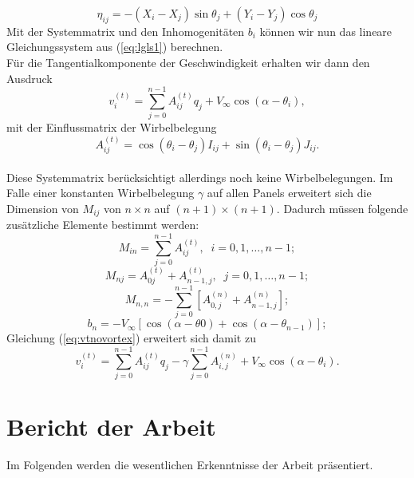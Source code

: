 \begin{equation}
\label{eq:eta}
\eta_{ij} =  -(X_i - X_j) \sin \theta _j + (Y_i - Y_j) \cos \theta _j
\end{equation}
Mit der Systemmatrix und den Inhomogenitäten $b_i$ können wir nun das lineare Gleichungssystem aus (\ref{eq:lgls1}) berechnen. \\
Für die Tangentialkomponente der Geschwindigkeit erhalten wir dann den Ausdruck
\begin{equation}
\label{eq:vtnovortex}
v_i^{(t)} =  \sum_{j=0}^{n-1} A_{ij}^{(t)} q_j + V_{\infty} \cos{(\alpha - \theta_i)},
\end{equation}
mit der Einflussmatrix der Wirbelbelegung
\begin{equation}
\label{eq:At}
A_{ij}^{(t)} =  \cos{(\theta _i - \theta _j)} I_{ij} + \sin{(\theta _i - \theta _j)} J_{ij}.
\end{equation}
\\
Diese Systemmatrix berücksichtigt allerdings noch keine Wirbelbelegungen. Im Falle einer konstanten Wirbelbelegung $\gamma$ auf allen Panels erweitert sich die Dimension von $M_{ij}$ von $n \times n$ auf $(n+1) \times (n+1)$. Dadurch müssen folgende zusätzliche Elemente bestimmt werden:
\begin{equation}
M_{in} =  \sum_{j=0}^{n-1} A_{ij}^{(t)}, \;\; i=0,1,\ldots, n-1;
\end{equation}
\begin{equation}
M_{nj} =  A_{0j}^{(t)} + A_{n-1,j}^{(t)}, \;\; j =0,1,\ldots, n-1;
\end{equation}
\begin{equation}
M_{n,n} =  - \sum_{j=0}^{n-1} \left[ A_{0,j}^{(n)} + A_{n-1,j}^{(n)}\right];
\end{equation}
\begin{equation}
b_n =  -V_{\infty} [\cos{(\alpha -\theta 0)} + \cos{(\alpha -\theta _{n-1})}];
\end{equation}
Gleichung (\ref{eq:vtnovortex}) erweitert sich damit zu
\begin{equation}
v_i^{(t)} =  \sum_{j=0}^{n-1} A_{ij}^{(t)} q_j - \gamma \sum_{j=0}^{n-1}A_{i,j}^{(n)} + V_{\infty} \cos{(\alpha - \theta_i)}.
\end{equation}
\newpage
\chapter{Bericht der Arbeit}
Im Folgenden werden die wesentlichen Erkenntnisse der Arbeit präsentiert.
